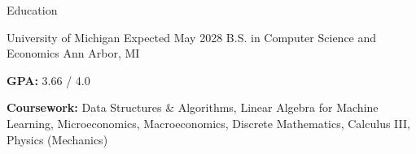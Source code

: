 \documentclass[
	11pt
]{../../../template}
\begin{document}
	\begin{rSection}{E}{ducation}
		\begin{rSectionEntry}
			{University of Michigan}
			{Expected May 2028}
			{B.S. in Computer Science and Economics}
			{}
			{Ann Arbor, MI}

			\item \textbf{GPA:} 3.66 / 4.0
			\item \textbf{Coursework:} Data Structures \& Algorithms, Linear Algebra for Machine Learning, Microeconomics, Macroeconomics, Discrete Mathematics, Calculus III, Physics (Mechanics)
		\end{rSectionEntry}
	\end{rSection}

\end{document}
